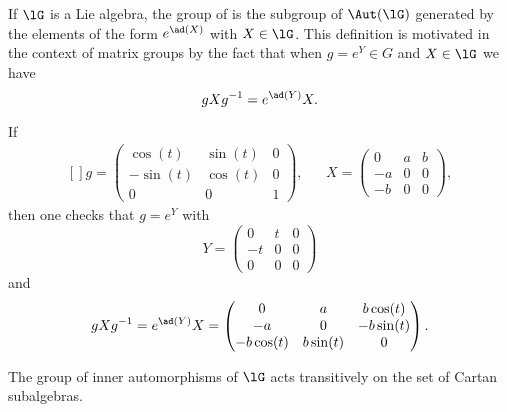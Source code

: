 If \( \lG\) is a Lie algebra, the group of  is the subgroup of \( \Aut(\lG)\) generated by the elements of the form \(  e^{\ad(X)}\) with \( X\in\lG\). This definition is motivated in the context of matrix groups by the fact that when \( g= e^{Y}\in G\) and \( X\in\lG\) we have
\begin{equation}
    gXg^{-1}= e^{\ad(Y)}X.
\end{equation}
\begin{example}
    If
    \begin{equation}
        \begin{aligned}[]
            g=\begin{pmatrix}
                \cos(t)    &   \sin(t)    &   0    \\
                -\sin(t)    &   \cos(t)    &   0    \\
                0    &   0    &   1
            \end{pmatrix},&&X=\begin{pmatrix}
                0    &   a    &   b    \\
                -a    &   0    &   0    \\
                -b    &   0    &   0
            \end{pmatrix},
        \end{aligned}
    \end{equation}
    then one checks that \( g= e^{Y}\) with
    \begin{equation}
        Y=\begin{pmatrix}
              0  &  t     &   0    \\
            -t    &   0    &   0    \\
            0    &   0    &   0
        \end{pmatrix}
    \end{equation}
    and
    \begin{equation}
        gXg^{-1}= e^{\ad(Y)}X=\begin{pmatrix}
            0    &   a    &   b\cos(t)    \\
            -a    &   0    &   -b\sin(t)    \\
            -b\cos(t)    &   b\sin(t)    &   0
        \end{pmatrix}.
    \end{equation}
\end{example}

\begin{theorem}
    The group of inner automorphisms of \( \lG\) acts transitively on the set of Cartan subalgebras.
\end{theorem}

